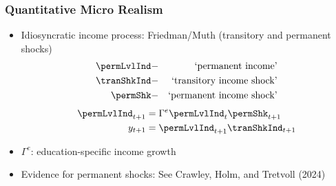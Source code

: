 \documentclass[pdflatex,aspectratio=169]{beamer}
\renewcommand{\PermGroFac}{\Gamma}
\begin{document}
\begin{frame}
  \frametitle{Quantitative Micro Realism}
\begin{itemize}
	\itemsep = \bigskipamount 
	\item Idiosyncratic income process: Friedman/Muth (transitory and permanent shocks)
  \providecommand{\permLvl}{}\renewcommand{\permLvl}{\permLvlInd}
  \begin{eqnarray*}
    \permLvlInd & - & \text{`permanent income'} \\
\tranShkInd & - & \text{`transitory income shock'}  \\
    \permShk & - & \text{`permanent income shock'}
  \end{eqnarray*}
  \begin{equation*}\begin{gathered}\begin{aligned}
    \permLvlInd_{t+1} & = \PermGroFac^{e} \permLvlInd_{t} \permShk_{t+1} \\
    y_{t+1} &= \permLvlInd_{t+1}\tranShkInd_{t+1} \\
  \end{aligned}\end{gathered}
\end{equation*}

\item $\PermGroFac^{e}$: education-specific income growth
\item Evidence for permanent shocks: See Crawley, Holm, and Tretvoll (2024)
\end{itemize}
\end{frame}

%
\end{document}
